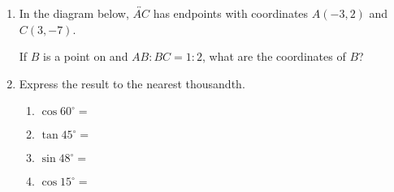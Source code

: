 \documentclass[12pt, twoside]{article}
\begin{document}
\begin{enumerate}
  \item In the diagram below, $\overleftrightarrow{AC}$ has endpoints with coordinates $A(-3,2)$ and $C(3, -7)$.
    \begin{center} %
    \end{center}
    If $B$ is a point on  and $AB {:} BC = 1{:}2$,  what  are  the  coordinates of $B$?

\newpage

\item Express the result to the nearest thousandth.  %
  \begin{multicols}{2}
    \begin{enumerate}
      \item $\cos 60^\circ = $ \vspace{0.5cm}
      \item $\tan 45^\circ =$
      \item $\sin 48^\circ = $ \vspace{0.5cm}
      \item $\cos 15^\circ =$
    \end{enumerate}
  \end{multicols}


\end{enumerate}
\end{document}
